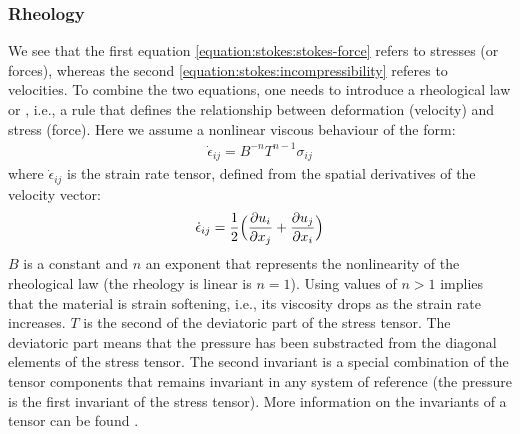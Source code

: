 \documentclass[letterpaper,10pt,english]{jupyterBook}
\begin{document}
\subsubsection{Rheology}
\label{\detokenize{stokes:rheology}}
\sphinxAtStartPar
We see that the first equation \eqref{equation:stokes:stokes-force} refers to stresses (or forces), whereas the second \eqref{equation:stokes:incompressibility} referes to velocities. To combine the two equations, one needs to introduce a rheological law or {\hyperref[\detokenize{glossary:term-Rheology}]{}}, i.e., a rule that defines the relationship between deformation (velocity) and stress (force). Here we assume a non\sphinxhyphen{}linear viscous behaviour of the form:
\begin{equation}\label{equation:stokes:rheology}
\begin{split}\dot\epsilon_{ij} = B^{-n}T^{n-1}\sigma_{ij}\end{split}
\end{equation}
\sphinxAtStartPar
where \(\dot\epsilon_{ij}\) is the strain rate tensor, defined from the spatial derivatives of the velocity vector:
\begin{equation}\label{equation:stokes:strain-rate}
\begin{split}\dot\epsilon_{ij}=\frac{1}{2}\Bigl(\frac{\partial u_i}{\partial x_j}+\frac{\partial u_j}{\partial x_i}\Bigr)\end{split}
\end{equation}
\sphinxAtStartPar
\(B\) is a constant and \(n\) an exponent that represents the non\sphinxhyphen{}linearity of the rheological law (the rheology is linear is \(n=1\)). Using values of \(n>1\) implies that the material is strain softening, i.e., its viscosity drops as the strain rate increases. \(T\) is the second {\hyperref[\detokenize{glossary:term-Invariant}]{}} of the deviatoric part of the stress tensor. The deviatoric part means that the pressure has been substracted from the diagonal elements of the stress tensor. The second invariant is a special combination of the tensor components that remains invariant in any system of reference (the pressure is the first invariant of the stress tensor). More information on the invariants of a tensor can be found .
\end{document}
